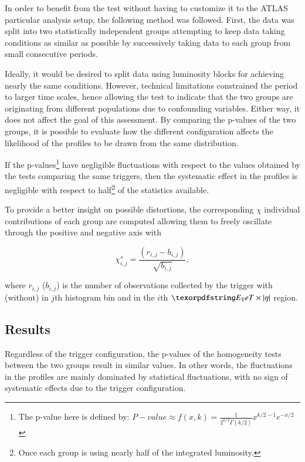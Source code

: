 In order to benefit from the test without having to customize it to the ATLAS particular analysis setup, the following method was followed. First, the data was split into two
statistically independent groups attempting to keep data taking conditions as
similar as possible by successively taking data to each group from small
consecutive periods.

Ideally, it would be desired to split data using luminosity
blocks for achieving nearly the same conditions. However, technical limitations
constrained the period to larger time scales, hence allowing the test to
indicate that the two groups are originating from different populations due to
confounding variables. Either way, it does not affect the goal of this assessment. 
By comparing the p-values of the two groups, it is possible to evaluate how the different configuration affects the likelihood of the profiles to be drawn from the same distribution. 


If the p-values\footnote{The p-value here is defined by: $P-value \approx f(x, k) = \frac{1}{2^{k/2}\Gamma(k/2)}x^{k/2 -1}e^{-x/2}$} have negligible fluctuations with respect to the values obtained by the tests comparing the same triggers, then the systematic effect in the profiles is negligible with respect to half\footnote{Once each group is using nearly half of the integrated luminosity.} of the statistics available.



To provide a better insight on possible distortions, the corresponding $\chi$
individual contributions of each group are computed allowing them to freely
oscillate through the positive and negative axis with

\begin{equation}
  \chi_{i,j}^{s} = \frac{(r_{i,j} - b_{i,j})}{\sqrt{b_{i,j}}},
  \label{eq:signed_chi}
\end{equation}

\noindent where $r_{i,j}$ ($b_{i,j}$) is the number of observations collected by
the trigger with (without) \rnn{} in $j$th histogram bin and in the $i$th
$\et{}\times\abseta{}$ region.


\subsection{Results}\label{top:agreement_homogeneity_results}




Regardless of the trigger configuration, the p-values of the homogeneity tests between the two groups result in similar values. In other words, the fluctuations in the profiles are mainly dominated by statistical fluctuations, with no sign of systematic effects due to the trigger configuration. 

